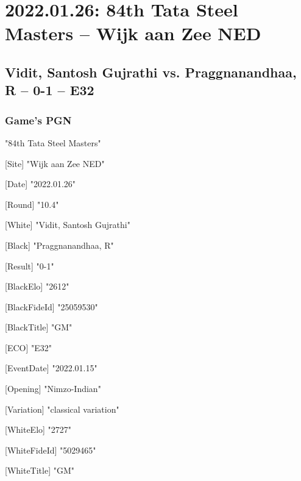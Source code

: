 \documentclass[9pt]{extarticle}
\begin{document}
\setlength{\columnsep}{32pt}
\section*{2022.01.26: 84th Tata Steel Masters -- Wijk aan Zee NED}

\subsection*{Vidit, Santosh Gujrathi vs. Praggnanandhaa, R -- 0-1 -- E32}
\subsubsection*{Game's PGN}
\begin{multicols}{2}
\begin{flushleft}
[Event] "84th Tata Steel Masters"

[Site] "Wijk aan Zee NED"

[Date] "2022.01.26"

[Round] "10.4"

[White] "Vidit, Santosh Gujrathi"

[Black] "Praggnanandhaa, R"

[Result] "0-1"

[BlackElo] "2612"

[BlackFideId] "25059530"

[BlackTitle] "GM"

[ECO] "E32"

[EventDate] "2022.01.15"

[Opening] "Nimzo-Indian"

[Variation] "classical variation"

[WhiteElo] "2727"

[WhiteFideId] "5029465"

[WhiteTitle] "GM"


\end{flushleft}
\end{multicols}
\end{document}
